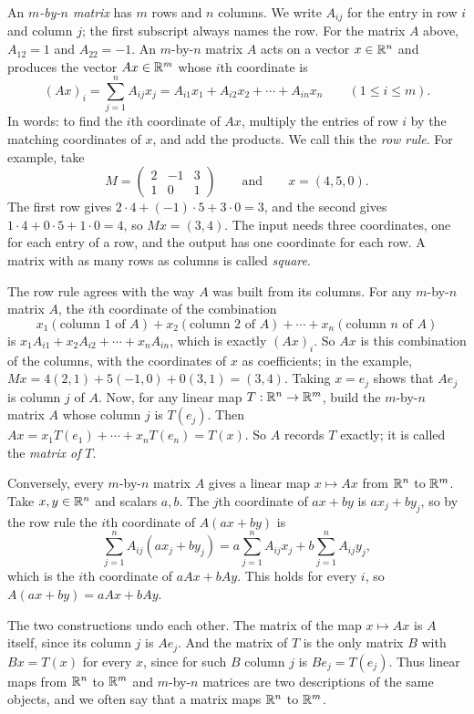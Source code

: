 An \emph{$m$-by-$n$ matrix} has $m$ rows and $n$ columns. We write $A_{ij}$ for the entry in row $i$ and column $j$; the first subscript always names the row. For the matrix $A$ above, $A_{12}=1$ and $A_{22}=-1$. An $m$-by-$n$ matrix $A$ acts on a vector $x\in\mathbb R^n$ and produces the vector $Ax\in\mathbb R^m$ whose $i$th coordinate is
\[
(Ax)_i=\sum_{j=1}^n A_{ij}x_j=A_{i1}x_1+A_{i2}x_2+\cdots+A_{in}x_n\qquad(1\le i\le m).
\]
In words: to find the $i$th coordinate of $Ax$, multiply the entries of row $i$ by the matching coordinates of $x$, and add the products. We call this the \emph{row rule}. For example, take
\[
M=\begin{pmatrix}2&-1&3\\1&0&1\end{pmatrix}\qquad\text{and}\qquad x=(4,5,0).
\]
The first row gives $2\cdot4+(-1)\cdot5+3\cdot0=3$, and the second gives $1\cdot4+0\cdot5+1\cdot0=4$, so $Mx=(3,4)$. The input needs three coordinates, one for each entry of a row, and the output has one coordinate for each row. A matrix with as many rows as columns is called \emph{square}.

The row rule agrees with the way $A$ was built from its columns. For any $m$-by-$n$ matrix $A$, the $i$th coordinate of the combination
\[
x_1(\text{column $1$ of $A$})+x_2(\text{column $2$ of $A$})+\cdots+x_n(\text{column $n$ of $A$})
\]
is $x_1A_{i1}+x_2A_{i2}+\cdots+x_nA_{in}$, which is exactly $(Ax)_i$. So $Ax$ is this combination of the columns, with the coordinates of $x$ as coefficients; in the example, $Mx=4(2,1)+5(-1,0)+0(3,1)=(3,4)$. Taking $x=e_j$ shows that $Ae_j$ is column $j$ of $A$. Now, for any linear map $T:\mathbb R^n\to\mathbb R^m$, build the $m$-by-$n$ matrix $A$ whose column $j$ is $T(e_j)$. Then $Ax=x_1T(e_1)+\cdots+x_nT(e_n)=T(x)$. So $A$ records $T$ exactly; it is called the \emph{matrix of} $T$.

Conversely, every $m$-by-$n$ matrix $A$ gives a linear map $x\mapsto Ax$ from $\mathbb R^n$ to $\mathbb R^m$. Take $x,y\in\mathbb R^n$ and scalars $a,b$. The $j$th coordinate of $ax+by$ is $ax_j+by_j$, so by the row rule the $i$th coordinate of $A(ax+by)$ is
\[
\sum_{j=1}^n A_{ij}(ax_j+by_j)=a\sum_{j=1}^n A_{ij}x_j+b\sum_{j=1}^n A_{ij}y_j,
\]
which is the $i$th coordinate of $aAx+bAy$. This holds for every $i$, so $A(ax+by)=aAx+bAy$.

The two constructions undo each other. The matrix of the map $x\mapsto Ax$ is $A$ itself, since its column $j$ is $Ae_j$. And the matrix of $T$ is the only matrix $B$ with $Bx=T(x)$ for every $x$, since for such $B$ column $j$ is $Be_j=T(e_j)$. Thus linear maps from $\mathbb R^n$ to $\mathbb R^m$ and $m$-by-$n$ matrices are two descriptions of the same objects, and we often say that a matrix maps $\mathbb R^n$ to $\mathbb R^m$.

